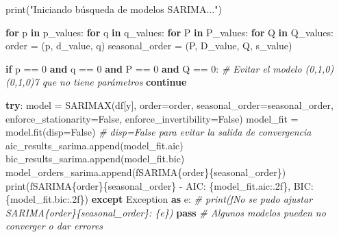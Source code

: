 \documentclass[
  11pt,
]{article}
\newenvironment{Shaded}{}{}
\newcommand{\BuiltInTok}[1]{\textcolor[rgb]{0.00,0.50,0.00}{#1}}
\newcommand{\CommentTok}[1]{\textcolor[rgb]{0.38,0.63,0.69}{\textit{#1}}}
\newcommand{\ControlFlowTok}[1]{\textcolor[rgb]{0.00,0.44,0.13}{\textbf{#1}}}
\newcommand{\DecValTok}[1]{\textcolor[rgb]{0.25,0.63,0.44}{#1}}
\newcommand{\ImportTok}[1]{\textcolor[rgb]{0.00,0.50,0.00}{\textbf{#1}}}
\newcommand{\KeywordTok}[1]{\textcolor[rgb]{0.00,0.44,0.13}{\textbf{#1}}}
\newcommand{\NormalTok}[1]{#1}
\newcommand{\OperatorTok}[1]{\textcolor[rgb]{0.40,0.40,0.40}{#1}}
\newcommand{\PreprocessorTok}[1]{\textcolor[rgb]{0.74,0.48,0.00}{#1}}
\newcommand{\SpecialCharTok}[1]{\textcolor[rgb]{0.25,0.44,0.63}{#1}}
\newcommand{\SpecialStringTok}[1]{\textcolor[rgb]{0.73,0.40,0.53}{#1}}
\newcommand{\StringTok}[1]{\textcolor[rgb]{0.25,0.44,0.63}{#1}}
\newcommand{\VariableTok}[1]{\textcolor[rgb]{0.10,0.09,0.49}{#1}}
\begin{document}
\begin{Shaded}
\begin{Highlighting}[]
\BuiltInTok{print}\NormalTok{(}\StringTok{"Iniciando búsqueda de modelos SARIMA..."}\NormalTok{)}

\ControlFlowTok{for}\NormalTok{ p }\KeywordTok{in}\NormalTok{ p\_values:}
    \ControlFlowTok{for}\NormalTok{ q }\KeywordTok{in}\NormalTok{ q\_values:}
        \ControlFlowTok{for}\NormalTok{ P }\KeywordTok{in}\NormalTok{ P\_values:}
            \ControlFlowTok{for}\NormalTok{ Q }\KeywordTok{in}\NormalTok{ Q\_values:}
\NormalTok{                order }\OperatorTok{=}\NormalTok{ (p, d\_value, q)}
\NormalTok{                seasonal\_order }\OperatorTok{=}\NormalTok{ (P, D\_value, Q, s\_value)}

                \ControlFlowTok{if}\NormalTok{ p }\OperatorTok{==} \DecValTok{0} \KeywordTok{and}\NormalTok{ q }\OperatorTok{==} \DecValTok{0} \KeywordTok{and}\NormalTok{ P }\OperatorTok{==} \DecValTok{0} \KeywordTok{and}\NormalTok{ Q }\OperatorTok{==} \DecValTok{0}\NormalTok{: }\CommentTok{\# Evitar el modelo (0,1,0)(0,1,0)7 que no tiene parámetros}
                    \ControlFlowTok{continue}

                \ControlFlowTok{try}\NormalTok{:}
\NormalTok{                    model }\OperatorTok{=}\NormalTok{ SARIMAX(df[}\StringTok{\textquotesingle{}y\textquotesingle{}}\NormalTok{], order}\OperatorTok{=}\NormalTok{order, seasonal\_order}\OperatorTok{=}\NormalTok{seasonal\_order,}
\NormalTok{                                    enforce\_stationarity}\OperatorTok{=}\VariableTok{False}\NormalTok{, enforce\_invertibility}\OperatorTok{=}\VariableTok{False}\NormalTok{)}
\NormalTok{                    model\_fit }\OperatorTok{=}\NormalTok{ model.fit(disp}\OperatorTok{=}\VariableTok{False}\NormalTok{) }\CommentTok{\# disp=False para evitar la salida de convergencia}
\NormalTok{                    aic\_results\_sarima.append(model\_fit.aic)}
\NormalTok{                    bic\_results\_sarima.append(model\_fit.bic)}
\NormalTok{                    model\_orders\_sarima.append(}\SpecialStringTok{f\textquotesingle{}SARIMA}\SpecialCharTok{\{}\NormalTok{order}\SpecialCharTok{\}\{}\NormalTok{seasonal\_order}\SpecialCharTok{\}}\SpecialStringTok{\textquotesingle{}}\NormalTok{)}
                    \BuiltInTok{print}\NormalTok{(}\SpecialStringTok{f\textquotesingle{}SARIMA}\SpecialCharTok{\{}\NormalTok{order}\SpecialCharTok{\}\{}\NormalTok{seasonal\_order}\SpecialCharTok{\}}\SpecialStringTok{ {-} AIC: }\SpecialCharTok{\{}\NormalTok{model\_fit}\SpecialCharTok{.}\NormalTok{aic}\SpecialCharTok{:.2f\}}\SpecialStringTok{, BIC: }\SpecialCharTok{\{}\NormalTok{model\_fit}\SpecialCharTok{.}\NormalTok{bic}\SpecialCharTok{:.2f\}}\SpecialStringTok{\textquotesingle{}}\NormalTok{)}
                \ControlFlowTok{except} \PreprocessorTok{Exception} \ImportTok{as}\NormalTok{ e:}
                    \CommentTok{\# print(f\textquotesingle{}No se pudo ajustar SARIMA\{order\}\{seasonal\_order\}: \{e\}\textquotesingle{})}
                    \ControlFlowTok{pass} \CommentTok{\# Algunos modelos pueden no converger o dar errores}


\end{Highlighting}
\end{Shaded}
\end{document}

